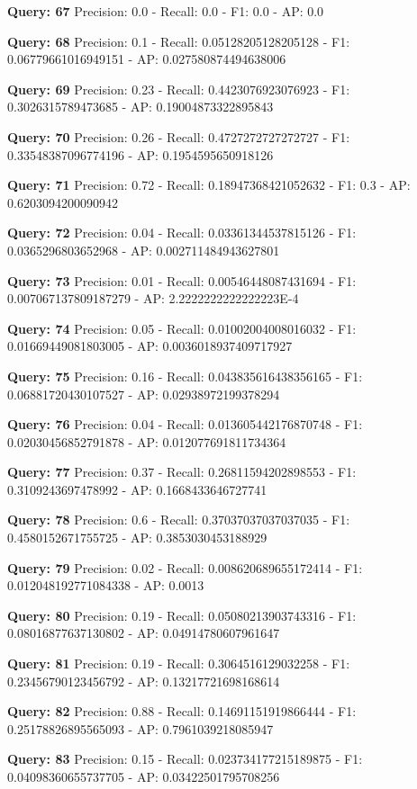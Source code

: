 \documentclass[a4paper, 11pt]{article}
\begin{document}
\textbf{Query: 67}
Precision: 0.0 - Recall: 0.0 - F1: 0.0 - AP:  0.0

\textbf{Query: 68}
Precision: 0.1 - Recall: 0.05128205128205128 - F1: 0.06779661016949151 - AP:  0.027580874494638006

\textbf{Query: 69}
Precision: 0.23 - Recall: 0.4423076923076923 - F1: 0.3026315789473685 - AP:  0.19004873322895843

\textbf{Query: 70}
Precision: 0.26 - Recall: 0.4727272727272727 - F1: 0.33548387096774196 - AP:  0.1954595650918126

\textbf{Query: 71}
Precision: 0.72 - Recall: 0.18947368421052632 - F1: 0.3 - AP:  0.6203094200090942

\textbf{Query: 72}
Precision: 0.04 - Recall: 0.03361344537815126 - F1: 0.0365296803652968 - AP:  0.002711484943627801

\textbf{Query: 73}
Precision: 0.01 - Recall: 0.00546448087431694 - F1: 0.007067137809187279 - AP:  2.2222222222222223E-4

\textbf{Query: 74}
Precision: 0.05 - Recall: 0.01002004008016032 - F1: 0.01669449081803005 - AP:  0.0036018937409717927

\textbf{Query: 75}
Precision: 0.16 - Recall: 0.043835616438356165 - F1: 0.06881720430107527 - AP:  0.02938972199378294

\textbf{Query: 76}
Precision: 0.04 - Recall: 0.013605442176870748 - F1: 0.02030456852791878 - AP:  0.012077691811734364

\textbf{Query: 77}
Precision: 0.37 - Recall: 0.26811594202898553 - F1: 0.3109243697478992 - AP:  0.1668433646727741

\textbf{Query: 78}
Precision: 0.6 - Recall: 0.37037037037037035 - F1: 0.4580152671755725 - AP:  0.3853030453188929

\textbf{Query: 79}
Precision: 0.02 - Recall: 0.008620689655172414 - F1: 0.012048192771084338 - AP: 0.0013

\textbf{Query: 80}
Precision: 0.19 - Recall: 0.05080213903743316 - F1: 0.08016877637130802 - AP:  0.04914780607961647

\textbf{Query: 81}
Precision: 0.19 - Recall: 0.3064516129032258 - F1: 0.23456790123456792 - AP:  0.13217721698168614

\textbf{Query: 82}
Precision: 0.88 - Recall: 0.14691151919866444 - F1: 0.25178826895565093 - AP:  0.7961039218085947

\textbf{Query: 83}
Precision: 0.15 - Recall: 0.023734177215189875 - F1: 0.04098360655737705 - AP:  0.03422501795708256
\end{document}
